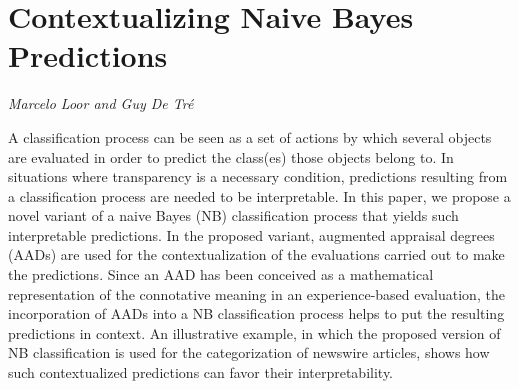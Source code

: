 \documentclass[../booklet.tex]{subfiles}
\begin{document}
\section[Contextualizing Naive Bayes Predictions. {\it Marcelo Loor and Guy De Tré}]{Contextualizing Naive Bayes Predictions}
 

\begin{center}
  {\it Marcelo Loor and Guy De Tré}
\end{center}

\vskip 0.8cm


A classification process can be seen as a set of actions by which several objects are evaluated in order to predict the class(es) those objects belong to. %
%
In situations where transparency is a necessary condition, predictions resulting from a classification process are needed to be interpretable. %
%
In this paper, we propose a novel variant of a naive Bayes (NB) classification process that yields such interpretable predictions. %
%
In the proposed variant, augmented appraisal degrees (AADs) are used for the contextualization of the evaluations carried out to make the predictions. %
%
Since an AAD has been conceived as a mathematical representation of the connotative meaning in an experience-based evaluation, the incorporation of AADs into a NB classification process helps to put the resulting predictions in context. %
%
An illustrative example, in which the proposed version of NB classification is used for the categorization of newswire articles, shows how such contextualized predictions can favor their interpretability. %
%

\end{document}
